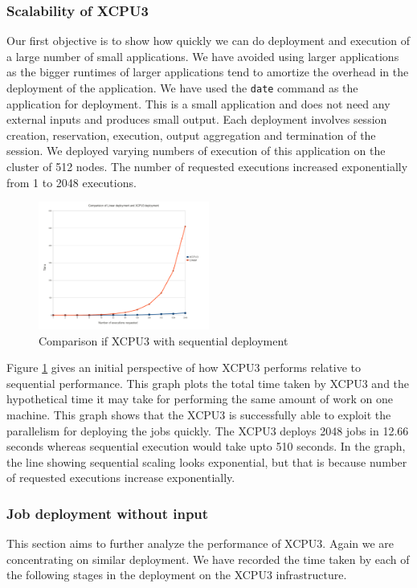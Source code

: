 \documentclass{sig-alternate}
\begin{document}
\subsubsection{Scalability of XCPU3}
Our first objective is to show how quickly we can do deployment and execution
of a large number of small applications. We have avoided using larger
applications as the bigger runtimes of larger applications tend to amortize the
overhead in the deployment of the application.  We have used the \texttt{date}
command as the application for deployment.  This is a small application and does
not need any external inputs and produces small output. Each deployment involves
session creation, reservation, execution, output aggregation and termination
of the session.  We deployed varying numbers of execution of this application on
the cluster of 512 nodes.  The number of requested executions increased
exponentially from 1 to 2048 executions.

\begin{figure}[h]
  \begin{center}
    \leavevmode
      \includegraphics[height=0.2\textheight,width=0.5\textwidth]
		{./img/linear}
    \caption{Comparison if XCPU3 with sequential deployment}
    \label{fig:sequential}
  \end{center}
\end{figure}

Figure \ref{fig:sequential} gives an initial perspective of how XCPU3 performs
relative to sequential performance.  This graph plots the total time taken by
XCPU3 and the hypothetical time it may take for performing the same amount of
work on one machine.  This graph shows that the XCPU3 is successfully able to
exploit the parallelism for deploying the jobs quickly. The XCPU3 deploys 2048
jobs in 12.66 seconds whereas sequential execution would take upto 510 seconds.
In the graph, the line showing sequential scaling looks exponential, but that is
because number of requested executions increase exponentially.


\subsubsection{Job deployment without input}
This section aims to further analyze the performance of XCPU3.  Again we are 
concentrating on similar deployment.  We have recorded the time taken by each
of the following stages in the deployment on the XCPU3 infrastructure.
\end{document}
